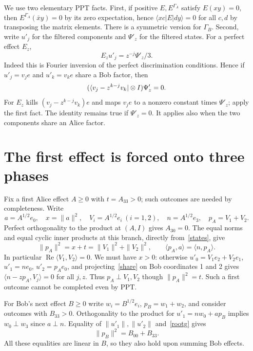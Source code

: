 \documentclass[11pt]{article}
\begin{document}
We use two elementary PPT facts. First, if positive $E,E^{\Gamma_A}$ satisfy $E(xy)=0$, then $E^{\Gamma_A}(\bar x y)=0$ by its zero expectation, hence $\langle x c|E|d y\rangle=0$ for all $c,d$ by transposing the matrix elements. There is a symmetric version for $\Gamma_B$. Second, write $u'_j$ for the filtered components and $\Psi'_z$ for the filtered states. For a perfect effect $E_z$,
\begin{equation} E_z u'_j=z^{-j}\Psi'_z/3 .\label{fourier}\end{equation}
Indeed this is Fourier inversion of the perfect discrimination conditions. Hence if $u'_j=v_j e$ and $u'_k=v_k e$ share a Bob factor, then
\begin{equation} (\langle v_j-z^{k-j}v_k|\otimes I)\Psi'_z=0.\label{share}\end{equation}
For $E_z$ kills $(v_j-z^{k-j}v_k)e$ and maps $v_j e$ to a nonzero constant times $\Psi'_z$; apply the first fact. The identity remains true if $\Psi'_z=0$. It applies also when the two components share an Alice factor.

\section{The first effect is forced onto three phases}
Fix a first Alice effect $A\ge0$ with $t=A_{33}>0$; such outcomes are needed by completeness. Write
\[
 a=A^{1/2}e_0,\quad x=\|a\|^2,\quad V_i=A^{1/2}e_i\ (i=1,2),\quad
 n=A^{1/2}e_3,\quad p_A=V_1+V_2 .
\]
Perfect orthogonality to the product at $(A,I)$ gives $A_{30}=0$. The equal norms and equal cyclic inner products at this branch, directly from~\eqref{states}, give
\begin{equation}
 \|p_A\|^2=x+t=\|V_1\|^2+\|V_2\|^2,\qquad
 \langle p_A,a\rangle=\langle n,p_A\rangle.\label{rootg}
\end{equation}
In particular $\operatorname{Re}\langle V_1,V_2\rangle=0$. We must have $x>0$: otherwise $u'_0=V_1e_2+V_2e_1$, $u'_1=ne_0$, $u'_2=p_Ae_0$, and projecting~\eqref{share} on Bob coordinates 1 and 2 gives $\langle n-zp_A,V_j\rangle=0$ for all $j,z$. Thus $p_A\perp V_1,V_2$ though $\|p_A\|^2=t$. Such a first outcome cannot be completed even by PPT.

For Bob's next effect $B\ge0$ write $w_i=B^{1/2}e_i$, $p_B=w_1+w_2$, and consider outcomes with $B_{33}>0$. Orthogonality to the product for $u'_1=n w_0+a p_B$ implies $w_0\perp w_3$ since $a\perp n$. Equality of $\|u'_1\|,\|u'_2\|$ and~\eqref{rootg} gives
\begin{equation} \|p_B\|^2=B_{00}+B_{33}.\label{corner}\end{equation}
All these equalities are linear in $B$, so they also hold upon summing Bob effects.
\end{document}
